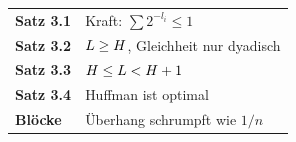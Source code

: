 \begin{merksatz}
\begin{center}
\renewcommand{\arraystretch}{1.5}
\begin{tabular}{@{}P{3.0cm}P{5.6cm}@{}}
\toprule
\textbf{Satz 3.1} & Kraft: $\sum 2^{-l_i} \le 1$\\
\textbf{Satz 3.2} & $L \ge H$, Gleichheit nur dyadisch\\
\textbf{Satz 3.3} & $H \le L < H+1$\\
\textbf{Satz 3.4} & Huffman ist optimal\\
\textbf{Blöcke} & Überhang schrumpft wie $1/n$\\
\bottomrule
\end{tabular}
\end{center}

\begin{center}
\begin{minipage}{0.88\textwidth}
\end{minipage}
\end{center}
\end{merksatz}
